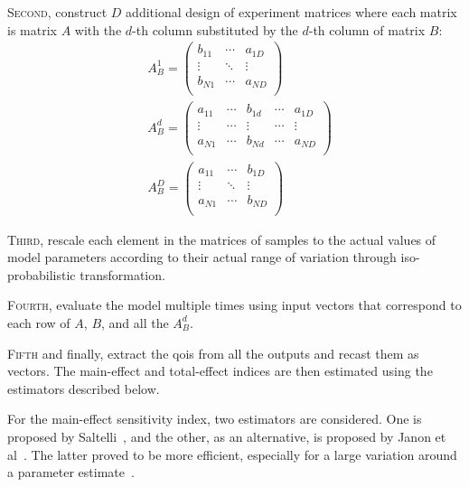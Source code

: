 \textsc{Second}, construct $D$ additional design of experiment matrices where each matrix is matrix $A$ with the $d$-th column substituted by the $d$-th column of matrix $B$:\begin{equation}
  \begin{split}
  & A_{B}^1 = 
  \begin{pmatrix}
    b_{11}  & \cdots  & a_{1D}\\
    \vdots	& \ddots & \vdots\\
    b_{N1}  & \cdots  & a_{ND}\\
  \end{pmatrix} \\
  & A_{B}^{d} = 
  \begin{pmatrix}
    a_{11}  & \cdots & b_{1d} & \cdots & a_{1D}\\
    \vdots	& \cdots & \vdots & \cdots & \vdots\\
    a_{N1}  & \cdots & b_{Nd} & \cdots & a_{ND}\\
  \end{pmatrix} \\
  & A_{B}^{D} = 
  \begin{pmatrix}
    a_{11}  & \cdots  & b_{1D}\\
    \vdots	& \ddots & \vdots\\
    a_{N1}  & \cdots  & b_{ND}\\
  \end{pmatrix}
  \end{split}
\label{eq:ss_sampling_resampling}
\end{equation}

\textsc{Third}, rescale each element in the matrices of samples to the actual values of model parameters according to their actual range of variation through iso-probabilistic transformation.

\textsc{Fourth}, evaluate the model multiple times using input vectors that correspond to each row of $A$, $B$, and all the $A_B^d$.

\textsc{Fifth} and finally, extract the \gls{qoi}s from all the outputs and recast them as vectors.
The main-effect and total-effect indices are then estimated using the estimators described below.

For the main-effect sensitivity index, two estimators are considered.
One is proposed by Saltelli~\cite{Saltelli2002}, and the other, as an alternative, is proposed by Janon et al~\cite{Janon2014}.
The latter proved to be more efficient, especially for a large variation around a parameter estimate~\cite{Iooss2015,Janon2014}.

